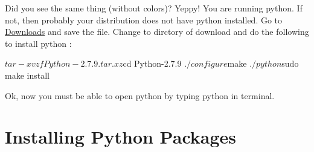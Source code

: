 
Did you see the same thing (without colors)? Yeppy! You are running python.
If not, then probably your distribution does not have python installed. Go to \href{https://www.python.org/ftp/python/2.7.9/Python-2.7.9.tar.xz}{Downloads} and save the file. Change to dirctory of download and do the following to install python :

\begin{bashcommands}
$tar -xvzf Python-2.7.9.tar.xz
$cd Python-2.7.9
$./configure
$make
$./python
$sudo make install
\end{bashcommands}

Ok, now you must be able to open python by typing {\color{magenta} python} in terminal.

\section{Installing Python Packages}